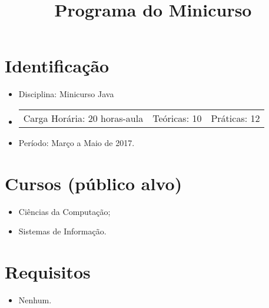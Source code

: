 \documentclass{article}
\title{Programa do Minicurso}
\author{}
\date{}
\begin{document}
\maketitle

\section{Identificação}

\begin{itemize}
    \item[] Disciplina: Minicurso Java
    \item[]
        \hspace{-1em}
        \begin{tabular}{ccc}
            Carga Horária: 20 horas-aula&
            Teóricas: 10&
            Práticas: 12
        \end{tabular}
    \item[] Período: Março a Maio de 2017.
\end{itemize}

\section{Cursos (público alvo)}
\begin{itemize}
    \item[] Ciências da Computação;
    \item[] Sistemas de Informação.
\end{itemize}

\section{Requisitos}
\begin{itemize}
    \item[] Nenhum.
\end{itemize}
\end{document}
